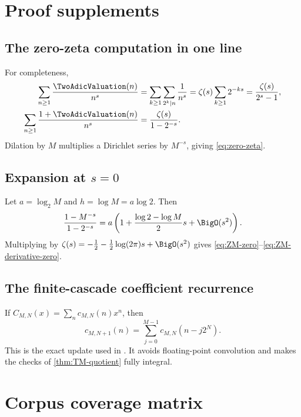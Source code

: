 \documentclass[11pt,oneside]{article}
\theoremstyle{definition}
\theoremstyle{remark}
\begin{document}
\appendix

\section{Proof supplements}
\label{app:proofs}

\subsection{The zero-zeta computation in one line}

For completeness,
\begin{align}
 \sum_{n\ge1}\frac{\TwoAdicValuation(n)}{n^s}
 &=\sum_{k\ge1}\sum_{2^k\mid n}\frac1{n^s}
 =\zeta(s)\sum_{k\ge1}2^{-ks}
 =\frac{\zeta(s)}{2^s-1},
 \label{eq:v2-Dirichlet}\\
 \sum_{n\ge1}\frac{1+\TwoAdicValuation(n)}{n^s}
 &=\frac{\zeta(s)}{1-2^{-s}}.
 \label{eq:m-Dirichlet}
\end{align}
Dilation by $M$ multiplies a Dirichlet series by $M^{-s}$, giving
\eqref{eq:zero-zeta}.

\subsection{Expansion at $s=0$}

Let $a=\log_2M$ and $h=\log M=a\log2$.  Then
\begin{equation}
 \frac{1-M^{-s}}{1-2^{-s}}
 =a\left(1+\frac{\log2-\log M}{2}s+\BigO(s^2)\right).
 \label{eq:A-at-zero}
\end{equation}
Multiplying by
$\zeta(s)=-\frac12-\frac12\log(2\pi)s+\BigO(s^2)$ gives
\eqref{eq:ZM-zero}--\eqref{eq:ZM-derivative-zero}.

\subsection{The finite-cascade coefficient recurrence}

If $C_{M,N}(x)=\sum_nc_{M,N}(n)x^n$, then
\begin{equation}
 c_{M,N+1}(n)=\sum_{j=0}^{M-1}c_{M,N}(n-j2^N).
 \label{eq:finite-coeff-recurrence}
\end{equation}
This is the exact update used in .  It avoids floating-point
convolution and makes the checks of \cref{thm:TM-quotient} fully integral.

\section{Corpus coverage matrix}
\label{app:corpus}
\end{document}

